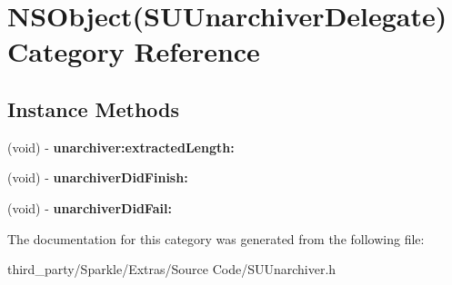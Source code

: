 \hypertarget{category_n_s_object_07_s_u_unarchiver_delegate_08}{}\section{N\+S\+Object(S\+U\+Unarchiver\+Delegate) Category Reference}
\label{category_n_s_object_07_s_u_unarchiver_delegate_08}
\subsection*{Instance Methods}
\begin{DoxyCompactItemize}
\item 
\mbox{\label{category_n_s_object_07_s_u_unarchiver_delegate_08_a3293e946fa114d9417b7b6cba3db24b2}} 
(void) -\/ {\bfseries unarchiver\+:extracted\+Length\+:}
\item 
\mbox{\label{category_n_s_object_07_s_u_unarchiver_delegate_08_afd25965de46f81f1ab97909758a7b8c6}} 
(void) -\/ {\bfseries unarchiver\+Did\+Finish\+:}
\item 
\mbox{\label{category_n_s_object_07_s_u_unarchiver_delegate_08_aebe569913d57052e0e1f3b4603307ddb}} 
(void) -\/ {\bfseries unarchiver\+Did\+Fail\+:}
\end{DoxyCompactItemize}


The documentation for this category was generated from the following file\+:\begin{DoxyCompactItemize}
\item 
third\+\_\+party/\+Sparkle/\+Extras/\+Source Code/S\+U\+Unarchiver.\+h\end{DoxyCompactItemize}
